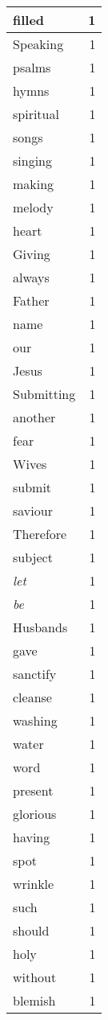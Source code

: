 \begin{center}
\begin{longtable}{l|r}
filled & 1\\ \hline 
Speaking & 1\\ \hline 
psalms & 1\\ \hline 
hymns & 1\\ \hline 
spiritual & 1\\ \hline 
songs & 1\\ \hline 
singing & 1\\ \hline 
making & 1\\ \hline 
melody & 1\\ \hline 
heart & 1\\ \hline 
Giving & 1\\ \hline 
always & 1\\ \hline 
Father & 1\\ \hline 
name & 1\\ \hline 
our & 1\\ \hline 
Jesus & 1\\ \hline 
Submitting & 1\\ \hline 
another & 1\\ \hline 
fear & 1\\ \hline 
Wives & 1\\ \hline 
submit & 1\\ \hline 
saviour & 1\\ \hline 
Therefore & 1\\ \hline 
subject & 1\\ \hline 
\emph{let} & 1\\ \hline 
\emph{be} & 1\\ \hline 
Husbands & 1\\ \hline 
gave & 1\\ \hline 
sanctify & 1\\ \hline 
cleanse & 1\\ \hline 
washing & 1\\ \hline 
water & 1\\ \hline 
word & 1\\ \hline 
present & 1\\ \hline 
glorious & 1\\ \hline 
having & 1\\ \hline 
spot & 1\\ \hline 
wrinkle & 1\\ \hline 
such & 1\\ \hline 
should & 1\\ \hline 
holy & 1\\ \hline 
without & 1\\ \hline 
blemish & 1\\ \hline 

\end{longtable}
\end{center}
